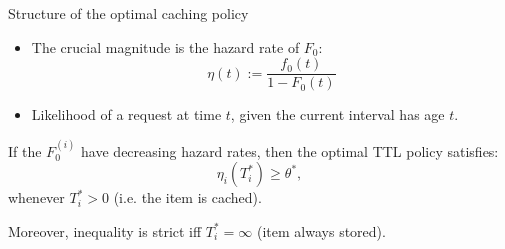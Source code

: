 \documentclass[aspectratio=169]{beamer}
\begin{document}



\begin{frame}{Structure of the optimal caching policy}

	\begin{itemize}
 	\item The crucial magnitude is the \alert{hazard rate} of $F_0$:
	\begin{equation*}
		\eta(t) := \frac{f_0(t)}{1-F_0(t)}
	\end{equation*}
	\item Likelihood of a request at time $t$, given the current interval has age $t$.
	\end{itemize}
	\pause

	\vfill

	\begin{theorem}

		If the $F_0^{(i)}$ have \alert{decreasing hazard rates}, then the optimal TTL policy satisfies:
			\begin{equation*}
				\eta_i (T_i^*) \geqslant \theta^*,
			   \end{equation*}
		whenever $T_i^*>0$ (i.e. the item is cached).
		
		Moreover, inequality is strict iff $T_i^*=\infty$ (item always stored).	  
	\end{theorem}

\end{frame}
\end{document}
